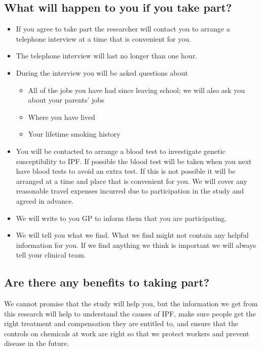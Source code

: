 \documentclass[a4paper,10pt]{article}
\begin{document}
\subsection*{What will happen to you if you take part?}
\begin{itemize}
 \item If you agree to take part the researcher will contact you to arrange a telephone interview at a time that is convenient for you.
 \item The telephone interview will last no longer than one hour.
 \item During the interview you will be asked questions about \begin{itemize}
                                                                \item All of the jobs you have had since leaving school; we will also ask you about your parents' jobs
                                                                \item Where you have lived 
                                                                \item Your lifetime smoking history
                                                               \end{itemize}
\item You will be contacted to arrange a blood test to investigate genetic susceptibility to IPF\@. If possible the blood test will be taken when you next have blood tests to avoid an extra test. If this is
not possible it will be arranged at a time and place that is convenient for you. We will cover any reasonable travel expenses incurred due to participation in the study and agreed in advance.
\item We will write to you GP to inform them that you are participating.
\item We will tell you what we find. What we find might not contain any helpful information for you. If we find anything we think is important we will always tell your clinical team.
\end{itemize}


\subsection*{Are there any benefits to taking part?}

We cannot promise that the study will help you, but the information we get from this research will help to understand the causes of IPF, make sure people get the right treatment and compensation they are entitled to, and ensure that the controls on chemicals at work are right so that we protect workers and prevent disease in the future.
\end{document}
